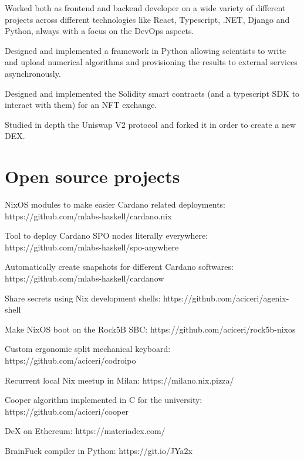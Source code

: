 \documentclass[]{cv}
\begin{document}
\begin{minipage}[t]{0.60\textwidth}
\begin{tightemize}
\item Worked both as frontend and backend developer on a wide variety of different projects across different technologies like React, Typescript, .NET, Django and Python, always with a focus on the DevOps aspects.
\item Designed and implemented a framework in Python allowing scientists to write and upload numerical algorithms and provisioning the results to external services asynchronously.
\item Designed and implemented the Solidity smart contracts (and a typescript SDK to interact with them) for an NFT exchange.
\item Studied in depth the Uniswap V2 protocol and forked it in order to create a new DEX.
\end{tightemize}
\sectionsep


\section{Open source projects}
\begin{tightemize}
\item NixOS modules to make easier Cardano related deployments: https://github.com/mlabs-haskell/cardano.nix
\item Tool to deploy Cardano SPO nodes literally everywhere: https://github.com/mlabs-haskell/spo-anywhere
\item Automatically create snapshots for different Cardano softwares: https://github.com/mlabs-haskell/cardanow
\item Share secrets using Nix development shells: https://github.com/aciceri/agenix-shell
\item Make NixOS boot on the Rock5B SBC: https://github.com/aciceri/rock5b-nixos
\item Custom ergonomic split mechanical keyboard: https://github.com/aciceri/codroipo
\item Recurrent local Nix meetup in Milan: https://milano.nix.pizza/ 
\item Cooper algorithm implemented in C for the university: https://github.com/aciceri/cooper
\item DeX on Ethereum: https://materiadex.com/
\item BrainFuck compiler in Python: https://git.io/JYa2x
\end{tightemize}
\sectionsep


\end{minipage}
\end{document}

